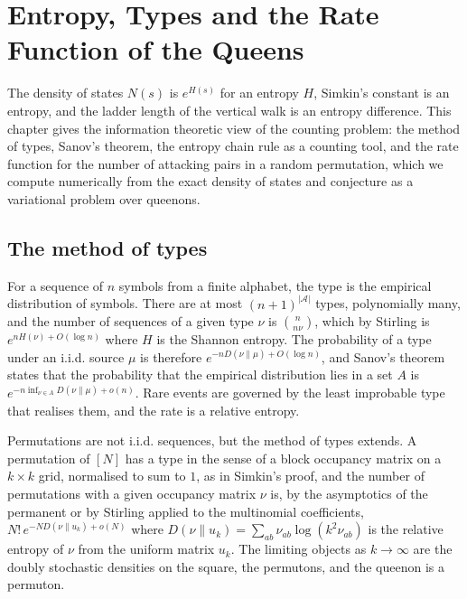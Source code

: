 \chapter{Entropy, Types and the Rate Function of the Queens}
\label{ch:entropy}

The density of states $N(s)$ is $e^{H(s)}$ for an entropy $H$, Simkin's constant is an entropy, and the ladder length of the vertical walk is an entropy difference. This chapter gives the information theoretic view of the counting problem: the method of types, Sanov's theorem, the entropy chain rule as a counting tool, and the rate function for the number of attacking pairs in a random permutation, which we compute numerically from the exact density of states and conjecture as a variational problem over queenons.

\section{The method of types}

For a sequence of $n$ symbols from a finite alphabet, the type is the empirical distribution of symbols. There are at most $(n+1)^{|\mathcal{A}|}$ types, polynomially many, and the number of sequences of a given type $\nu$ is $\binom{n}{n \nu}$, which by Stirling is $e^{n H(\nu) + O(\log n)}$ where $H$ is the Shannon entropy. The probability of a type under an i.i.d. source $\mu$ is therefore $e^{-n D(\nu \| \mu) + O(\log n)}$, and Sanov's theorem states that the probability that the empirical distribution lies in a set $A$ is $e^{-n \inf_{\nu \in A} D(\nu \| \mu) + o(n)}$. Rare events are governed by the least improbable type that realises them, and the rate is a relative entropy.

Permutations are not i.i.d. sequences, but the method of types extends. A permutation of $[N]$ has a type in the sense of a block occupancy matrix on a $k \times k$ grid, normalised to sum to $1$, as in Simkin's proof, and the number of permutations with a given occupancy matrix $\nu$ is, by the asymptotics of the permanent or by Stirling applied to the multinomial coefficients, $N! \, e^{-N D(\nu \| u_k) + o(N)}$ where $D(\nu \| u_k) = \sum_{ab} \nu_{ab} \log(k^2 \nu_{ab})$ is the relative entropy of $\nu$ from the uniform matrix $u_k$. The limiting objects as $k \to \infty$ are the doubly stochastic densities on the square, the permutons, and the queenon is a permuton.

